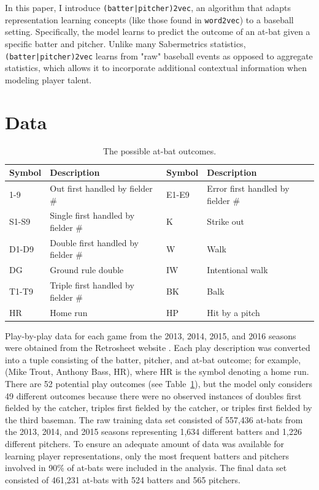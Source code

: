 \documentclass{article}
\begin{document}
In this paper, I introduce \texttt{(batter|pitcher)2vec}, an algorithm that adapts representation learning concepts (like those found in \texttt{word2vec}) to a baseball setting. Specifically, the model learns to predict the outcome of an at-bat given a specific batter and pitcher. Unlike many Sabermetrics statistics, \texttt{(batter|pitcher)2vec} learns from "raw" baseball events as opposed to aggregate statistics, which allows it to incorporate additional contextual information when modeling player talent.

\section{Data}
\label{data}

\begin{table}[h]
\caption{The possible at-bat outcomes.}
\centering
\begin{adjustbox}{max width=\textwidth}
    \begin{tabular}{ | l | l | l | l | }
    \hline
    Symbol & Description & Symbol & Description \\ 
    \hline\hline
    1-9 & Out first handled by fielder \# & E1-E9 & Error first handled by fielder \# \\
    \hline
    S1-S9 & Single first handled by fielder \# & K & Strike out \\
    \hline
    D1-D9 & Double first handled by fielder \# & W & Walk \\
    \hline
    DG & Ground rule double & IW & Intentional walk \\
    \hline
    T1-T9 & Triple first handled by fielder \# & BK & Balk \\
    \hline
    HR & Home run & HP & Hit by a pitch \\
    \hline
    \end{tabular}
\end{adjustbox}
\label{table:at_bats}
\end{table}

Play-by-play data for each game from the 2013, 2014, 2015, and 2016 seasons were obtained from the Retrosheet website \parencite{Retro}. Each play description was converted into a tuple consisting of the batter, pitcher, and at-bat outcome; for example, (Mike Trout, Anthony Bass, HR), where HR is the symbol denoting a home run. There are 52 potential play outcomes (see Table~\ref{table:at_bats}), but the model only considers 49 different outcomes because there were no observed instances of doubles first fielded by the catcher, triples first fielded by the catcher, or triples first fielded by the third baseman. The raw training data set consisted of 557,436 at-bats from the 2013, 2014, and 2015 seasons representing 1,634 different batters and 1,226 different pitchers. To ensure an adequate amount of data was available for learning player representations, only the most frequent batters and pitchers involved in 90\% of at-bats were included in the analysis. The final data set consisted of 461,231 at-bats with 524 batters and 565 pitchers.
\end{document}
